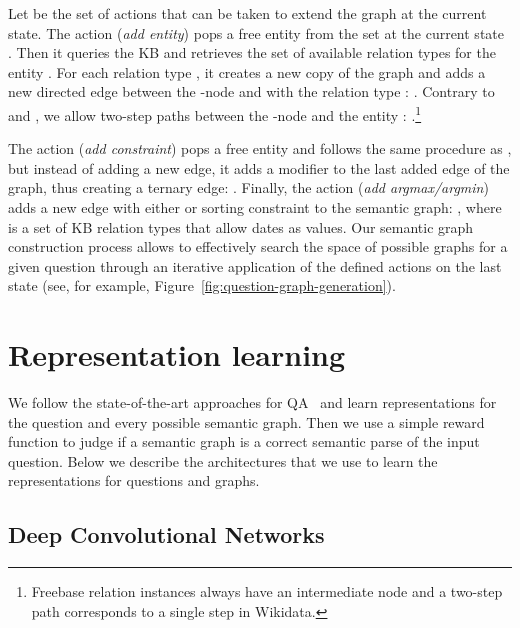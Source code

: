 \documentclass[11pt]{article}
\begin{document}
Let  be the set of actions that can be taken to extend the graph at the current state. The action  (\textit{add entity}) pops a free entity  from the set  at the current state . Then it queries the KB and retrieves the set of available relation types  for the entity . For each relation type , it creates a new copy of the graph and adds a new directed edge between the -node and  with the relation type :  . Contrary to  and , we allow two-step paths between the -node and the entity : .\footnote{Freebase relation instances always have an intermediate node and a two-step path corresponds to a single step in Wikidata.}

The action  (\textit{add constraint}) pops a free entity  and follows the same procedure as , but instead of adding a new edge, it adds a modifier to the last added edge of the graph, thus creating a ternary edge: . Finally, the action  (\textit{add argmax/argmin}) adds a new edge with either  or  sorting constraint to the semantic graph: , where  is a set of KB relation types that allow dates as values. Our semantic graph construction process allows to effectively search the space of possible graphs for a given question through an iterative application of the defined actions  on the last state  (see, for example, Figure~\ref{fig:question-graph-generation}). 


\section{Representation learning}

We follow the state-of-the-art approaches for QA~\cite{Yih2015,Dong2015,Bao2016} and learn representations for the question and every possible semantic graph. Then we use a simple reward function  to judge if a semantic graph is a correct semantic parse of the input question. Below we describe the architectures that we use to learn the representations for questions and graphs. 

\subsection{Deep Convolutional Networks}
\label{sec:dcnn}
\end{document}
